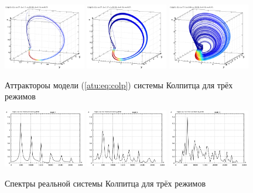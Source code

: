 \begin{figure}[htb!]
 \centerline{
   \includegraphics[width=0.32\textwidth]{p/cha/colp/colp_0-p_xyz_b=1x70.png}
   \includegraphics[width=0.32\textwidth]{p/cha/colp/colp_0-p_xyz_b=1x37.png}
   \includegraphics[width=0.32\textwidth]{p/cha/colp/colp_0-p_xyz_b=0x99.png}
 }
  \caption{Аттрактороы модели (\ref{atu:eq:colp}) системы Колпитца для трёх режимов}
  \label{atu:f:colp_model_xyz}
\end{figure}

\begin{figure}[htb!]
 \centerline{
   \includegraphics[width=0.32\textwidth]{p/cha/colp/colp_m1_f.png}
   \includegraphics[width=0.32\textwidth]{p/cha/colp/colp_m2_f.png}
   \includegraphics[width=0.32\textwidth]{p/cha/colp/colp_m3_f.png}
 }
  \caption{Спектры реальной системы Колпитца  для трёх режимов}
  \label{atu:f:colp_real_f}
\end{figure}

